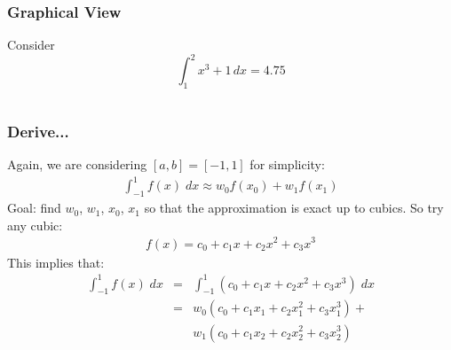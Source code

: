 \documentclass[10pt]{beamer}
\begin{document}
\begin{frame}
\frametitle{Graphical View}
  Consider
    \begin{equation*}
      \int_{1}^{2} x^3 + 1\,dx = 4.75
    \end{equation*}
    \begin{columns}
      \begin{column}{0.45\textwidth}
      \end{column}
      \begin{column}{0.45\textwidth}
      \end{column}
    \end{columns}
\end{frame}
\begin{frame}
\frametitle{Derive...}
Again, we are considering $[a,b] = [-1,1]$ for simplicity:
\begin{eqnarray*}
  \int_{-1}^1 f(x) \; \mathit{dx} \approx w_0 f(x_0) + w_1 f(x_1)
\end{eqnarray*}
Goal: find $w_0$, $w_1$, $x_0$, $x_1$ so that the approximation is exact up to
cubics.  So try any cubic:
\begin{eqnarray*}
  f(x) = c_0 + c_1 x + c_2 x^2 + c_3 x^3
\end{eqnarray*}
This implies that:
\begin{eqnarray*}
 \int_{-1}^1 f(x) \; \mathit{dx} &=& \int_{-1}^1 \left( c_0 + c_1 x +
 c_2 x^2 + c_3 x^3 \right) \; \mathit{dx} \\
       &=& w_0 \left(c_0 + c_1 x_1 + c_2 x_1^2 + c_3 x_1^3 \right) +   \\
       & & w_1 \left(c_0 + c_1 x_2 + c_2 x_2^2 + c_3 x_2^3 \right) \\
\end{eqnarray*}
\end{frame}
\end{document}
